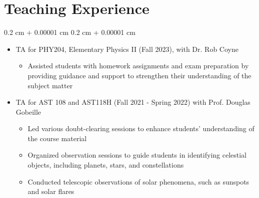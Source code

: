 \documentclass[10pt, letterpaper]{article}
\newenvironment{highlightsforbulletentries}{
    \begin{itemize}[
        topsep=0.10 cm,
        parsep=0.10 cm,
        partopsep=0pt,
        itemsep=0pt,
        leftmargin=10pt
    ]
}{
    \end{itemize}
}
\newenvironment{onecolentry}{
    \begin{adjustwidth}{
        0.2 cm + 0.00001 cm
    }{
        0.2 cm + 0.00001 cm
    }
}{
    \end{adjustwidth}
}
\begin{document}
\section{Teaching Experience}
\begin{onecolentry}
    \begin{highlightsforbulletentries}
      \item TA for PHY204, Elementary Physics II (Fall 2023), with Dr. Rob Coyne
      \begin{itemize}
        \item Assisted students with homework assignments and exam preparation by providing guidance and support to strengthen their understanding of the subject matter
      \end{itemize}

      \item TA for AST 108 and AST118H (Fall 2021 - Spring 2022) with Prof. Douglas Gobeille
      \begin{itemize}
        \item Led various doubt-clearing sessions to enhance students' understanding of the course material
        \item Organized observation sessions to guide students in identifying celestial objects, including planets, stars, and constellations
        \item Conducted telescopic observations of solar phenomena, such as sunspots and solar flares
      \end{itemize}   
    \end{highlightsforbulletentries}
\end{onecolentry}


\end{document}
